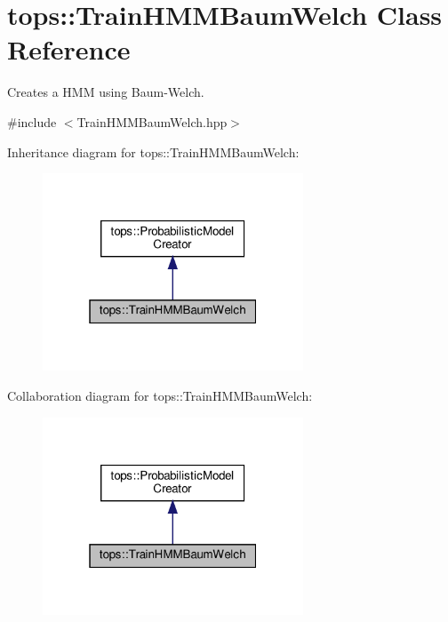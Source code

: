 \hypertarget{classtops_1_1TrainHMMBaumWelch}{}\section{tops\+:\+:Train\+H\+M\+M\+Baum\+Welch Class Reference}
\label{classtops_1_1TrainHMMBaumWelch}


Creates a H\+MM using Baum-\/\+Welch.  




{\ttfamily \#include $<$Train\+H\+M\+M\+Baum\+Welch.\+hpp$>$}



Inheritance diagram for tops\+:\+:Train\+H\+M\+M\+Baum\+Welch\+:
\nopagebreak
\begin{figure}[H]
\begin{center}
\leavevmode
\includegraphics[width=220pt]{classtops_1_1TrainHMMBaumWelch__inherit__graph}
\end{center}
\end{figure}


Collaboration diagram for tops\+:\+:Train\+H\+M\+M\+Baum\+Welch\+:
\nopagebreak
\begin{figure}[H]
\begin{center}
\leavevmode
\includegraphics[width=220pt]{classtops_1_1TrainHMMBaumWelch__coll__graph}
\end{center}
\end{figure}
